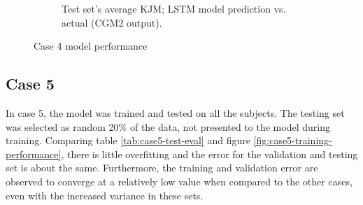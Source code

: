 \documentclass[../main.tex]{subfiles}
\begin{document}
\begin{figure}[!htb]
\begin{subfigure}[b]{0.515\textwidth}
         \caption{Test set's average \ac{KJM}; LSTM model prediction vs. actual (CGM2 output).}
         \label{fig:case4-prediction-performance}
     \end{subfigure}
    \caption{Case 4 model performance}
    \label{fig:case4-performance-plots}
\end{figure}


\subsection{Case 5}
\label{sec:results-case5}
In case 5, the model was trained and tested on all the subjects. 
The testing set was selected as random 20\% of the data, not presented to the model during training.
Comparing table \ref{tab:case5-test-eval} and figure \ref{fig:case5-training-performance}, there is little overfitting and the error for the validation and testing set is about the same.
Furthermore, the training and validation error are observed to converge at a relatively low value when compared to the other cases, even with the increased variance in these sets.
\newpage
\end{document}
